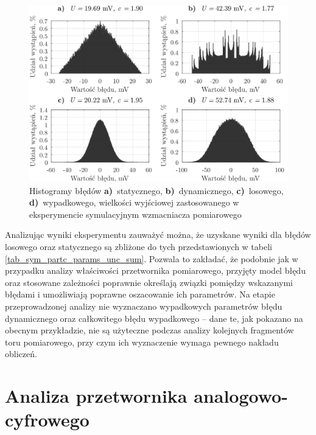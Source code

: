\begin{figure}[htb!]
\begin{center}
\includegraphics{obrazki/hist_part_b}
\caption{Histogramy błędów \textbf{a)}~statycznego, \textbf{b)}~dynamicznego, \textbf{c)}~losowego, \textbf{d)}~wypadkowego, wielkości wyjściowej zastosowanego w eksperymencie symulacyjnym wzmacniacza pomiarowego \label{fig_symul_partb_hist}}
\end{center}
\end{figure}

Analizując wyniki eksperymentu zauważyć można, że uzyskane wyniki dla błędów losowego oraz statycznego są zbliżone do tych przedstawionych w tabeli \ref{tab_sym_partc_params_unc_sum}. Pozwala to zakładać, że podobnie jak w przypadku analizy właściwości przetwornika pomiarowego, przyjęty model błędu oraz stosowane zależności poprawnie określają związki pomiędzy wskazanymi błędami i umożliwiają poprawne oszacowanie ich parametrów. Na etapie przeprowadzonej analizy nie wyznaczano wypadkowych parametrów błędu dynamicznego oraz całkowitego błędu wypadkowego -- dane te, jak pokazano na obecnym przykładzie, nie są użyteczne podczas analizy kolejnych fragmentów toru pomiarowego, przy czym ich wyznaczenie wymaga pewnego nakładu obliczeń.

\section{Analiza przetwornika analogowo-cyfrowego}

